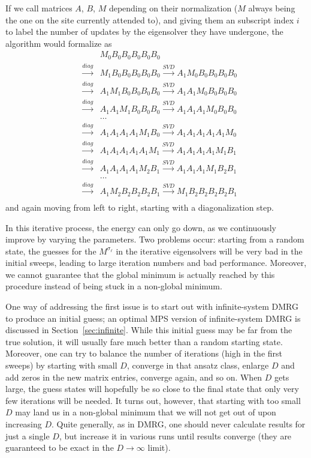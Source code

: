 \documentclass[a4paper,10pt,oneside,onecolumn,1p,times]{elsarticle}
\begin{document}
If we call matrices $A$, $B$, $M$ depending on their normalization ($M$ always being the one on the site currently attended to), and giving them an subscript index $i$ to label the number of updates by the eigensolver they have undergone, the algorithm would formalize as
\begin{eqnarray*}
& & M_0 B_0 B_0 B_0 B_0 B_0 \\
&\stackrel{diag}{\rightarrow}& M_1 B_0 B_0 B_0 B_0 B_0 
\stackrel{SVD}{\rightarrow} A_1 M_0 B_0 B_0 B_0 B_0 \\
&\stackrel{diag}{\rightarrow}& A_1 M_1 B_0 B_0 B_0 B_0 
\stackrel{SVD}{\rightarrow} A_1 A_1 M_0 B_0 B_0 B_0 \\
&\stackrel{diag}{\rightarrow}& A_1 A_1 M_1 B_0 B_0 B_0 
\stackrel{SVD}{\rightarrow} A_1 A_1 A_1 M_0 B_0 B_0 \\
& & \ldots \\
&\stackrel{diag}{\rightarrow}& A_1 A_1 A_1 A_1 M_1 B_0 
\stackrel{SVD}{\rightarrow} A_1 A_1 A_1 A_1 A_1 M_0 \\
&\stackrel{diag}{\rightarrow}& A_1 A_1 A_1 A_1 A_1 M_1 
\stackrel{SVD}{\rightarrow} A_1 A_1 A_1 A_1 M_1 B_1 \\
&\stackrel{diag}{\rightarrow}& A_1 A_1 A_1 A_1 M_2 B_1 
\stackrel{SVD}{\rightarrow} A_1 A_1 A_1 M_1 B_2 B_1 \\
& & \ldots \\
&\stackrel{diag}{\rightarrow}& A_1 M_2 B_2 B_2 B_2 B_1 
\stackrel{SVD}{\rightarrow} M_1 B_2 B_2 B_2 B_2 B_1 \\
\end{eqnarray*}
and again moving from left to right, starting with a diagonalization step.

In this iterative process, the energy can only go down, as we continuously improve by varying the parameters. Two problems occur: starting from a random state, the guesses for the $M^{\sigma_\ell}$ in the iterative eigensolvers will be very bad in the initial sweeps, leading to large iteration numbers and bad performance. Moreover, we cannot guarantee that the global minimum is actually reached by this procedure instead of being stuck in a non-global minimum.

One way of addressing the first issue is to start out with infinite-system DMRG to produce an initial guess; an optimal MPS version of infinite-system DMRG is discussed in Section~\ref{sec:infinite}. While this initial guess may be far from the true solution, it will usually fare much better than a random starting state. Moreover, one can try to balance the number of iterations (high in the first sweeps) by starting with small $D$, converge in that ansatz class, enlarge $D$ and add zeros in the new matrix entries, converge again, and so on. When $D$ gets large, the guess states will hopefully be so close to the final state that only very few iterations will be needed. It turns out, however, that starting with too small $D$ may land us in a non-global minimum that we will not get out of upon increasing $D$. Quite generally, as in DMRG, one should never calculate results for just a single $D$, but increase it in various runs until results converge (they are guaranteed to be exact in the $D\rightarrow\infty$ limit).
\end{document}
